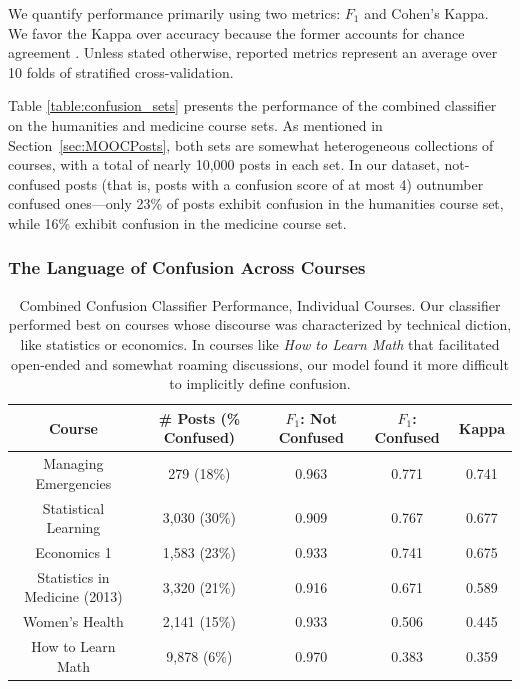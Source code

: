 \documentclass{edm_template}
\begin{document}
We quantify performance primarily using two metrics: $F_{1}$ and Cohen's Kappa. We favor the Kappa over accuracy because the former accounts for chance agreement \cite{cohen1960coefficient}. Unless stated otherwise, reported metrics represent an average over 10 folds of stratified cross-validation. 

Table \ref{table:confusion_sets} presents the performance of the combined classifier on the humanities and medicine course sets. As mentioned in Section~\ref{sec:MOOCPosts}, both sets are somewhat heterogeneous collections of courses, with a total of nearly 10,000 posts in each set. In our dataset, not-confused posts (that is, posts with a confusion score of at most 4) outnumber confused ones---only 23\% of posts exhibit confusion in the humanities course set, while 16\% exhibit confusion in the medicine course set.

\vspace{-0.3cm}
\subsubsection{The Language of Confusion Across Courses}

\begin{table}
       \centering
       \begin{tabular}{|c|c|c|c|c|}
       \hline
       Course                         & \# Posts (\% Confused) & $F_{1}$: Not Confused & $F_{1}$: Confused & Kappa \\ \hline
       Managing Emergencies              & 279 (18\%)                         & 0.963                 & 0.771             & 0.741 \\ \hline
       Statistical Learning              & 3,030 (30\%)                        & 0.909                 & 0.767             & 0.677 \\ \hline
       Economics 1                       & 1,583 (23\%)                     & 0.933                 & 0.741             & 0.675 \\ \hline
       Statistics in Medicine (2013)     & 3,320 (21\%)                         & 0.916                 & 0.671             & 0.589 \\ \hline
       Women's Health                    & 2,141 (15\%)                         & 0.933                 & 0.506             & 0.445 \\ \hline
       How to Learn Math                 & 9,878 (6\%)                        & 0.970                 & 0.383             & 0.359 \\ \hline
       \end{tabular}
       \caption{\textnormal{
       Combined Confusion Classifier Performance, Individual Courses. Our classifier performed best on courses whose discourse was characterized by technical diction, like statistics or economics. In courses like \emph{How to Learn Math} that facilitated open-ended and somewhat roaming discussions, our model found it more difficult to implicitly define confusion. 
       }} %
       \label{table:confusion_courses} %
\end{table}
\end{document}

